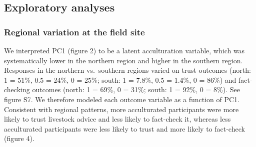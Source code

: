\documentclass[
  11pt,
]{article}
\begin{document}
\hypertarget{exploratory-analyses-1}{%
\subsection{Exploratory analyses}\label{exploratory-analyses-1}}

\hypertarget{regional-variation-at-the-field-site}{%
\subsubsection{Regional variation at the field
site}\label{regional-variation-at-the-field-site}}

We interpreted PC1 (figure 2) to be a latent acculturation variable,
which was systematically lower in the northern region and higher in the
southern region. Responses in the northern vs.~southern regions varied
on trust outcomes (north: 1 = 51\%, 0.5 = 24\%, 0 = 25\%; south: 1 =
7.8\%, 0.5 = 1.4\%, 0 = 86\%) and fact-checking outcomes (north: 1 =
69\%, 0 = 31\%; south: 1 = 92\%, 0 = 8\%). See figure S7. We therefore
modeled each outcome variable as a function of PC1. Consistent with
regional patterns, more acculturated participants were more likely to
trust livestock advice and less likely to fact-check it, whereas less
acculturated participants were less likely to trust and more likely to
fact-check (figure 4).
\end{document}
